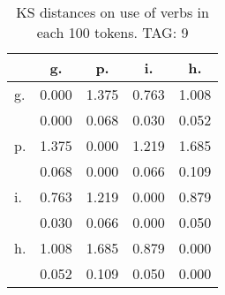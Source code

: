 \begin{table}[h!]
\begin{center}
\begin{tabular}{| l | c | c | c | c |}\hline
 & g. & p. & i. & h. \\\hline
g. & 0.000  & 1.375  & 0.763  & 1.008 \\\hline
 & 0.000  & 0.068  & 0.030  & 0.052 \\\hline
p. & 1.375  & 0.000  & 1.219  & 1.685 \\\hline
 & 0.068  & 0.000  & 0.066  & 0.109 \\\hline
i. & 0.763  & 1.219  & 0.000  & 0.879 \\\hline
 & 0.030  & 0.066  & 0.000  & 0.050 \\\hline
h. & 1.008  & 1.685  & 0.879  & 0.000 \\\hline
 & 0.052  & 0.109  & 0.050  & 0.000 \\\hline
\end{tabular}
\caption{KS distances on use of verbs in each 100 tokens. TAG: 9}
\end{center}
\end{table}